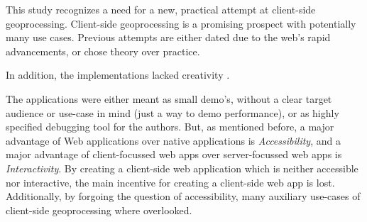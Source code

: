 This study recognizes a need for a new, practical attempt at client-side geoprocessing. 
Client-side geoprocessing is a promising prospect with potentially many use cases.
Previous attempts are either dated due to the web's rapid advancements, or chose theory over practice.

In addition, the implementations lacked creativity . 

The applications were either meant as small demo's, without a clear target audience or use-case in mind (just a way to demo performance), or as highly specified debugging tool for the authors.   
But, as mentioned before, a major advantage of Web applications over native applications is \emph{Accessibility}, and a major advantage of client-focussed web apps over server-focussed web apps is \emph{Interactivity}. 
By creating a client-side web application which is neither accessible nor interactive, the main incentive for creating a client-side web app is lost.
Additionally, by forgoing the question of accessibility, many auxiliary use-cases of client-side geoprocessing where overlooked.